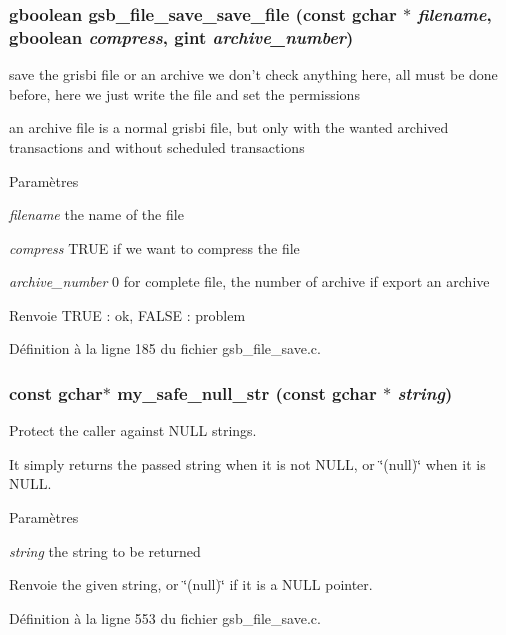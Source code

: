 \subsubsection[{gsb\_\-file\_\-save\_\-save\_\-file}]{\setlength{\rightskip}{0pt plus 5cm}gboolean gsb\_\-file\_\-save\_\-save\_\-file (const gchar $\ast$ {\em filename}, \/  gboolean {\em compress}, \/  gint {\em archive\_\-number})}\label{gsb__file__save_8h_a07b27e36f7166f5eae93c162039a78a7}
save the grisbi file or an archive we don't check anything here, all must be done before, here we just write the file and set the permissions

an archive file is a normal grisbi file, but only with the wanted archived transactions and without scheduled transactions


\begin{DoxyParams}{Paramètres}
\item[{\em filename}]the name of the file \item[{\em compress}]TRUE if we want to compress the file \item[{\em archive\_\-number}]0 for complete file, the number of archive if export an archive\end{DoxyParams}
\begin{DoxyReturn}{Renvoie}
TRUE : ok, FALSE : problem 
\end{DoxyReturn}


Définition à la ligne 185 du fichier gsb\_\-file\_\-save.c.

\subsubsection[{my\_\-safe\_\-null\_\-str}]{\setlength{\rightskip}{0pt plus 5cm}const gchar$\ast$ my\_\-safe\_\-null\_\-str (const gchar $\ast$ {\em string})}\label{gsb__file__save_8h_afab094df64a133cffdeb914484e1e52d}
Protect the caller against NULL strings.

It simply returns the passed string when it is not NULL, or \char`\"{}(null)\char`\"{} when it is NULL.


\begin{DoxyParams}{Paramètres}
\item[{\em string}]the string to be returned\end{DoxyParams}
\begin{DoxyReturn}{Renvoie}
the given string, or \char`\"{}(null)\char`\"{} if it is a NULL pointer. 
\end{DoxyReturn}


Définition à la ligne 553 du fichier gsb\_\-file\_\-save.c.

